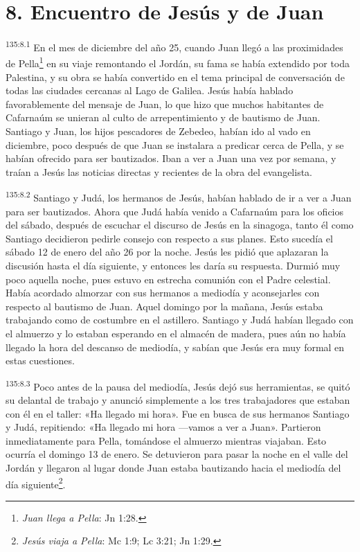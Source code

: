 \section*{8. Encuentro de Jesús y de Juan}
\par
\textsuperscript{135:8.1} En el mes de diciembre del año 25, cuando Juan llegó a las proximidades de Pella\footnote{\textit{Juan llega a Pella}: Jn 1:28.} en su viaje remontando el Jordán, su fama se había extendido por toda Palestina, y su obra se había convertido en el tema principal de conversación de todas las ciudades cercanas al Lago de Galilea. Jesús había hablado favorablemente del mensaje de Juan, lo que hizo que muchos habitantes de Cafarnaúm se unieran al culto de arrepentimiento y de bautismo de Juan. Santiago y Juan, los hijos pescadores de Zebedeo, habían ido al vado en diciembre, poco después de que Juan se instalara a predicar cerca de Pella, y se habían ofrecido para ser bautizados. Iban a ver a Juan una vez por semana, y traían a Jesús las noticias directas y recientes de la obra del evangelista.

\par
\textsuperscript{135:8.2} Santiago y Judá, los hermanos de Jesús, habían hablado de ir a ver a Juan para ser bautizados. Ahora que Judá había venido a Cafarnaúm para los oficios del sábado, después de escuchar el discurso de Jesús en la sinagoga, tanto él como Santiago decidieron pedirle consejo con respecto a sus planes. Esto sucedía el sábado 12 de enero del año 26 por la noche. Jesús les pidió que aplazaran la discusión hasta el día siguiente, y entonces les daría su respuesta. Durmió muy poco aquella noche, pues estuvo en estrecha comunión con el Padre celestial. Había acordado almorzar con sus hermanos a mediodía y aconsejarles con respecto al bautismo de Juan. Aquel domingo por la mañana, Jesús estaba trabajando como de costumbre en el astillero. Santiago y Judá habían llegado con el almuerzo y lo estaban esperando en el almacén de madera, pues aún no había llegado la hora del descanso de mediodía, y sabían que Jesús era muy formal en estas cuestiones.

\par
\textsuperscript{135:8.3} Poco antes de la pausa del mediodía, Jesús dejó sus herramientas, se quitó su delantal de trabajo y anunció simplemente a los tres trabajadores que estaban con él en el taller: «Ha llegado mi hora». Fue en busca de sus hermanos Santiago y Judá, repitiendo: «Ha llegado mi hora ---vamos a ver a Juan». Partieron inmediatamente para Pella, tomándose el almuerzo mientras viajaban. Esto ocurría el domingo 13 de enero. Se detuvieron para pasar la noche en el valle del Jordán y llegaron al lugar donde Juan estaba bautizando hacia el mediodía del día siguiente\footnote{\textit{Jesús viaja a Pella}: Mc 1:9; Lc 3:21; Jn 1:29.}.

